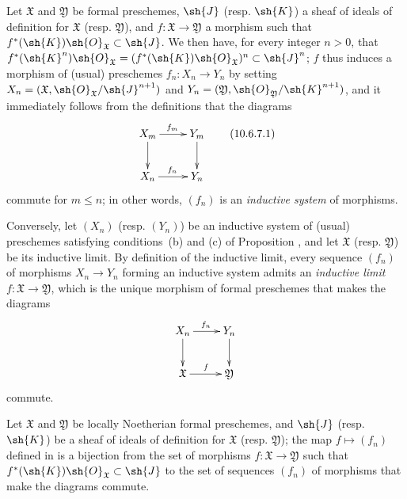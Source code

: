 \begin{env}[10.6.7]
\label{I.10.6.7}
Let $\mathfrak{X}$ and $\mathfrak{Y}$ be formal preschemes, $\sh{J}$ (resp. $\sh{K}$) a sheaf of ideals of definition for $\mathfrak{X}$ (resp. $\mathfrak{Y}$), and $f:\mathfrak{X}\to\mathfrak{Y}$ a morphism such that $f^*(\sh{K})\sh{O}_\mathfrak{X}\subset\sh{J}$.
We then have, for every integer $n>0$, that $f^*(\sh{K}^n)\sh{O}_\mathfrak{X}=(f^*(\sh{K})\sh{O}_\mathfrak{X})^n\subset\sh{J}^n$; $f$ thus induces  a morphism of (usual) preschemes $f_n:X_n\to Y_n$ by setting $X_n=(\mathfrak{X},\sh{O}_\mathfrak{X}/\sh{J}^{n+1})$ and $Y_n=(\mathfrak{Y},\sh{O}_\mathfrak{Y}/\sh{K}^{n+1})$, and it immediately follows from the definitions that the diagrams
\[
\label{I.10.6.7.1}
  \xymatrix{
    X_m\ar[r]^{f_m}\ar[d] &
    Y_m\ar[d]\\
    X_n\ar[r]^{f_n} &
    Y_n
  }
  \tag{10.6.7.1}
\]
commute for $m\leq n$; in other words, $(f_n)$ is an \emph{inductive system} of morphisms.
\end{env}

\begin{env}[10.6.8]
\label{I.10.6.8}
Conversely, let $(X_n)$ (resp. $(Y_n)$) be an inductive system of (usual) preschemes satisfying conditions~(b) and (c) of Proposition , and let $\mathfrak{X}$ (resp. $\mathfrak{Y}$) be its inductive limit.
By definition of the inductive limit, every sequence $(f_n)$ of morphisms $X_n\to Y_n$ forming an inductive system admits an \emph{inductive limit $f:\mathfrak{X}\to\mathfrak{Y}$}, which is the unique morphism of formal preschemes that makes the diagrams
\[
  \xymatrix{
    X_n\ar[r]^{f_n}\ar[d] &
    Y_n\ar[d]\\
    \mathfrak{X}\ar[r]^f &
    \mathfrak{Y}
  }
\]
commute.
\end{env}

\begin{proposition}[10.6.9]
\label{I.10.6.9}
Let $\mathfrak{X}$ and $\mathfrak{Y}$ be locally Noetherian formal preschemes, and $\sh{J}$ (resp. $\sh{K}$) be a sheaf of ideals of definition for $\mathfrak{X}$ (resp. $\mathfrak{Y}$); the map $f\mapsto(f_n)$ defined in  is a bijection from the set of morphisms $f:\mathfrak{X}\to\mathfrak{Y}$ such that $f^*(\sh{K})\sh{O}_\mathfrak{X}\subset\sh{J}$ to the set of sequences $(f_n)$ of morphisms that make the diagrams  commute.
\end{proposition}

